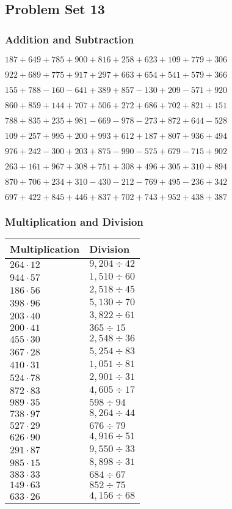 \hypertarget{problem-set-13-2}{%
\subsection{Problem Set 13}\label{problem-set-13-2}}

\hypertarget{addition-and-subtraction-113}{%
\subsubsection{Addition and
Subtraction}\label{addition-and-subtraction-113}}

\(187 + 649 + 785 + 900 + 816 + 258 + 623 + 109 + 779 + 306\)

\(922 + 689 + 775 + 917 + 297 + 663 + 654 + 541 + 579 + 366\)

\(155 + 788 - 160 - 641 + 389 + 857 - 130 + 209 - 571 + 920\)

\(860 + 859 + 144 + 707 + 506 + 272 + 686 + 702 + 821 + 151\)

\(788 + 835 + 235 + 981 - 669 - 978 - 273 + 872 + 644 - 528\)

\(109 + 257 + 995 + 200 + 993 + 612 + 187 + 807 + 936 + 494\)

\(976 + 242 - 300 + 203 + 875 - 990 - 575 + 679 - 715 + 902\)

\(263 + 161 + 967 + 308 + 751 + 308 + 496 + 305 + 310 + 894\)

\(870 + 706 + 234 + 310 - 430 - 212 - 769 + 495 - 236 + 342\)

\(697 + 422 + 845 + 446 + 837 + 702 + 743 + 952 + 438 + 387\)

\hypertarget{multiplication-and-division-113}{%
\subsubsection{Multiplication and
Division}\label{multiplication-and-division-113}}

\begin{longtable}[]{@{}ll@{}}
\toprule
Multiplication & Division\tabularnewline
\midrule
\endhead
\(264 \cdot 12\) & \(9,204÷42\)\tabularnewline
\(944 \cdot 57\) & \(1,510÷60\)\tabularnewline
\(186 \cdot 56\) & \(2,518÷45\)\tabularnewline
\(398 \cdot 96\) & \(5,130÷70\)\tabularnewline
\(203 \cdot 40\) & \(3,822÷61\)\tabularnewline
\(200 \cdot 41\) & \(365÷15\)\tabularnewline
\(455 \cdot 30\) & \(2,548÷36\)\tabularnewline
\(367 \cdot 28\) & \(5,254÷83\)\tabularnewline
\(410 \cdot 31\) & \(1,051÷81\)\tabularnewline
\(524 \cdot 78\) & \(2,901÷31\)\tabularnewline
\(872 \cdot 83\) & \(4,605÷17\)\tabularnewline
\(989 \cdot 35\) & \(598÷94\)\tabularnewline
\(738 \cdot 97\) & \(8,264÷44\)\tabularnewline
\(527 \cdot 29\) & \(676÷79\)\tabularnewline
\(626 \cdot 90\) & \(4,916÷51\)\tabularnewline
\(291 \cdot 87\) & \(9,550÷33\)\tabularnewline
\(985 \cdot 15\) & \(8,898÷31\)\tabularnewline
\(383 \cdot 33\) & \(684÷67\)\tabularnewline
\(149 \cdot 63\) & \(852÷75\)\tabularnewline
\(633 \cdot 26\) & \(4,156÷68\)\tabularnewline
\bottomrule
\end{longtable}

